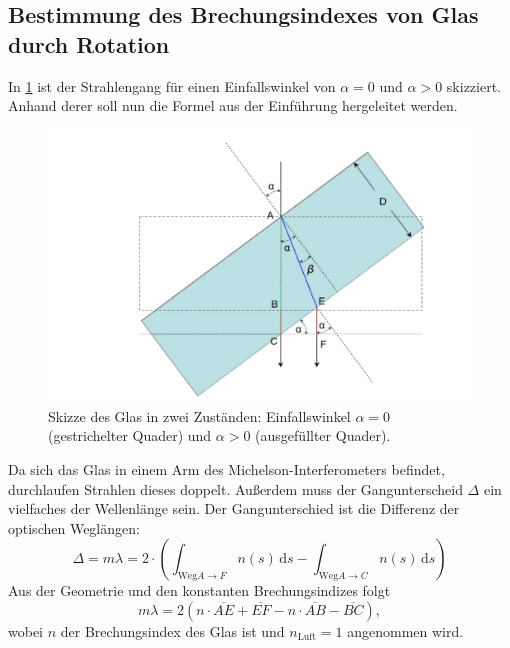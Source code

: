 \documentclass[
	a4paper,
	12pt,
	pagesize,
	ngerman
]{scrartcl}
\begin{document}
	\subsection{Bestimmung des Brechungsindexes von Glas durch Rotation} %
	In \cref{fig_glass_rotation} ist der Strahlengang für einen Einfallswinkel von $\alpha=0$ und $\alpha>0$ skizziert.
	Anhand derer soll nun die Formel aus der Einführung hergeleitet werden. %
	\begin{figure}[H]
		\includegraphics[width=1.0\textwidth]{images/Formula}
		\centering
		\caption{Skizze des Glas in zwei Zuständen: Einfallswinkel $\alpha= 0$ (gestrichelter Quader) und $\alpha>0$ (ausgefüllter Quader).\cite{GlasFormula}} %
		\label{fig_glass_rotation}
		\centering
	\end{figure}

	Da sich das Glas in einem Arm des Michelson-Interferometers befindet, durchlaufen Strahlen dieses doppelt.
	Außerdem muss der Gangunterscheid $\Delta$ ein vielfaches der Wellenlänge sein. Der Gangunterschied ist die Differenz der optischen Weglängen:
	\begin{equation}
		\Delta = m\lambda = 2 \cdot \left(\int_{\text{Weg} A \rightarrow F} \! n(s) \, \mathrm{d}s - \int_{\text{Weg} A \rightarrow C} \! n(s) \, \mathrm{d}s \right)
	\end{equation}
	Aus der Geometrie und den konstanten Brechungsindizes folgt
	\begin{equation}
		m\lambda = 2(n\cdot \overline{AE} + \overline{EF} - n \cdot \overline{AB} - \overline{BC}),
		\label{eq_glas_2}
	\end{equation}
	wobei $n$ der Brechungsindex des Glas ist und $n_\text{Luft}=1$ angenommen wird.
\end{document}
